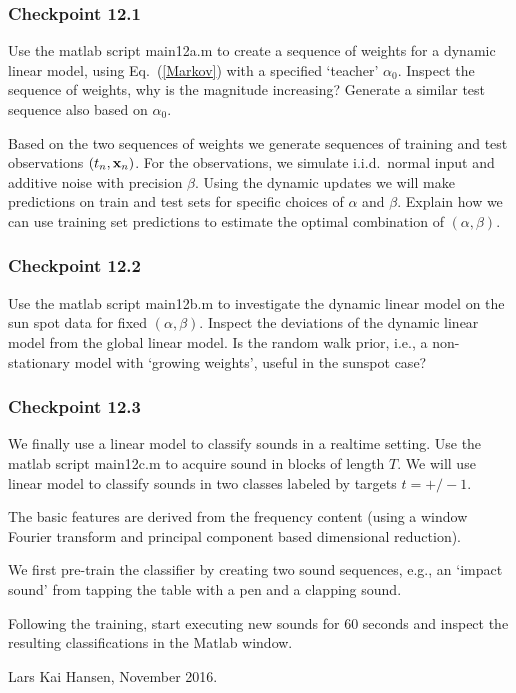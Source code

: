\documentclass[A4,12pt]{article}    %
\def\xb{{\bf x}}
\def\xb{{\bf x}}
\begin{document}
\subsubsection*{Checkpoint 12.1}
Use the matlab script {\sf main12a.m} to create a sequence of weights for a dynamic linear model, using Eq.\ (\ref{Markov}) with a specified `teacher' $\alpha_0$. Inspect the sequence of weights, why is the magnitude increasing? Generate a similar test sequence also based on  $\alpha_0$.

Based on the two sequences of weights we generate sequences of training and test observations $(t_n,\xb_n)$. For the observations, we simulate i.i.d.\ normal input and additive noise with precision $\beta$. Using the dynamic updates we will make predictions on train and test sets for specific choices of $\alpha$ and $\beta$. Explain how we can use training set predictions to estimate the optimal combination of $(\alpha, \beta)$.

\subsubsection*{Checkpoint 12.2}
Use the matlab script {\sf main12b.m} to investigate the dynamic linear model on the sun spot data for fixed  $(\alpha, \beta)$. Inspect the deviations of the dynamic linear model from the global linear model. Is the random walk prior, i.e., a non-stationary model with `growing weights', useful in the sunspot case?

\subsubsection*{Checkpoint 12.3}
We finally use a linear model to classify sounds in a realtime setting. Use the matlab script {\sf main12c.m} to acquire sound in blocks of length $T$.
We will use linear model to classify sounds in two classes labeled by targets $t=+/- 1$.

The basic features are derived from the frequency content (using a window Fourier transform and principal component based dimensional reduction).

We first pre-train the classifier by creating two sound sequences, e.g., an `impact sound' from tapping the table with a pen and a clapping sound.

Following the training, start executing new sounds for 60 seconds  and inspect the resulting classifications in the Matlab window.

\vspace*{2cm}

Lars Kai Hansen, November 2016.
\end{document}
